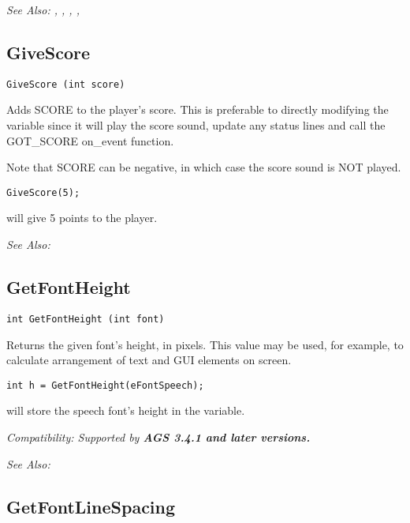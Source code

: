 \it{See Also:} ,
,
,
, 


\subsection{GiveScore}\label{GiveScore}%

\begin{verbatim}
GiveScore (int score)
\end{verbatim}
Adds SCORE to the player's score. This is preferable to directly modifying
the variable since it will play the score sound, update any status lines
and call the GOT_SCORE on_event function.

Note that SCORE can be negative, in which case the score sound is NOT played.

\begin{verbatim}
GiveScore(5);
\end{verbatim}
will give 5 points to the player.

\it{See Also:} 


\subsection{GetFontHeight}\label{GetFontHeight}%

\begin{verbatim}
int GetFontHeight (int font)
\end{verbatim}
Returns the given font's height, in pixels. This value may be used, for example, to calculate arrangement of text and GUI elements on screen.

\begin{verbatim}
int h = GetFontHeight(eFontSpeech);
\end{verbatim}
will store the speech font's height in the variable.

\it{Compatibility:} Supported by \bf{AGS 3.4.1} and later versions.

\it{See Also:} 


\subsection{GetFontLineSpacing}\label{GetFontLineSpacing}%

